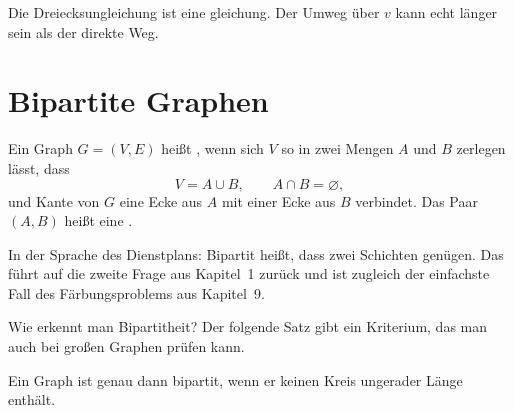 \begin{warnung}
Die Dreiecksungleichung ist eine gleichung. Der Umweg über $v$ kann echt länger sein als der direkte Weg.

\begin{center}
\end{center}
\end{warnung}

\section{Bipartite Graphen}

\begin{definition}
Ein Graph $G = (V,E)$ heißt , wenn sich $V$ so in zwei Mengen $A$ und $B$ zerlegen lässt, dass
\[ V = A \cup B, \qquad A \cap B = \varnothing, \]
und  Kante von $G$ eine Ecke aus $A$ mit einer Ecke aus $B$ verbindet. Das Paar $(A,B)$ heißt eine .
\end{definition}

In der Sprache des Dienstplans: Bipartit heißt, dass zwei Schichten genügen. Das führt auf die zweite Frage aus Kapitel~1 zurück und ist zugleich der einfachste Fall des Färbungsproblems aus Kapitel~9.

Wie erkennt man Bipartitheit? Der folgende Satz gibt ein Kriterium, das man auch bei großen Graphen prüfen kann.

\begin{merksatz}
Ein Graph ist genau dann bipartit, wenn er keinen Kreis ungerader Länge enthält.
\end{merksatz}

